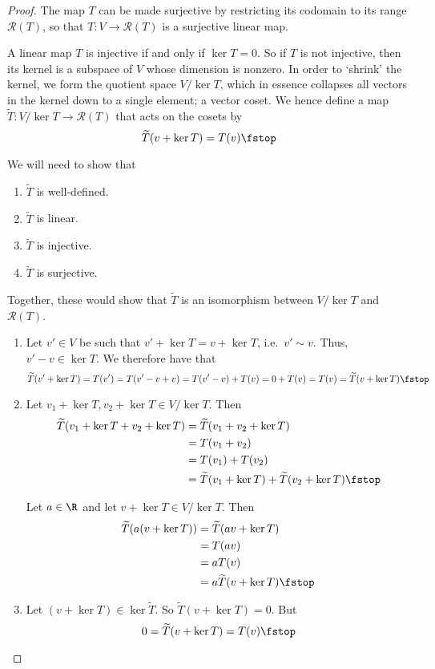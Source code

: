  \begin{proof}
   The map \( T \) can be made surjective by restricting its codomain to its range \( \mathcal{R}(T) \), so that \( T:V\to\mathcal{R}(T) \) is a surjective linear map.

   \vspace{3mm}

   A linear map \( T \) is injective if and only if \( \ker T=\qty{0} \). So if \( T \) is not injective, then its kernel is a subspace of \( V \) whose dimension is nonzero. In order to `shrink' the kernel, we form the quotient space \( V/\ker T \), which in essence collapses all vectors in the kernel down to a single element; a vector coset. We hence define a map \( \widetilde{T}:V/\ker T\to\mathcal{R}(T) \) that acts on the cosets by
   \[ \widetilde{T}(v+\ker T)=T(v)\fstop \]

   We will need to show that
   \begin{enumerate}[label=(\roman*)]
   \item \( \widetilde{T} \) is well-defined.
   \item \( \widetilde{T} \) is linear.
   \item \( \widetilde{T} \) is injective.
   \item \( \widetilde{T} \) is surjective.
   \end{enumerate}

   Together, these would show that \( \widetilde{T} \) is an isomorphism between \( V/\ker T \) and \( \mathcal{R}(T) \).
   \begin{enumerate}[label=(\roman*)]
   \item Let \( v'\in V \) be such that \( v'+\ker T=v+\ker T \), i.e.\ \( v'\sim v \). Thus, \( v'-v\in\ker T \). We therefore have that
     \[ \widetilde{T}(v'+\ker T)=T(v')=T(v'-v+v)=T(v'-v)+T(v)=0+T(v)=T(v)=\widetilde{T}(v+\ker T)\fstop \]
   \item Let \( v_1+\ker T, v_2+\ker T\in V/\ker T \). Then
     \begin{align*}
       \widetilde{T}(v_1+\ker T+v_2+\ker T)&= \widetilde{T}(v_1+v_2+\ker T)\\
       &= T(v_1+v_2)\\
       &= T(v_1)+T(v_2)\\
       &= \widetilde{T}(v_1+\ker T)+\widetilde{T}(v_2+\ker T)\fstop
     \end{align*}

     Let \( a\in\R \) and let \( v+\ker T\in V/\ker T \). Then
     \begin{align*}
       \widetilde{T}(a(v+\ker T))&= \widetilde{T}(av+\ker T)\\
       &= T(av)\\
       &= aT(v)\\
       &= a\widetilde{T}(v+\ker T)\fstop
     \end{align*}
   \item Let \( (v+\ker T)\in\ker\widetilde{T} \). So \( \widetilde{T}(v+\ker T)=0 \). But
     \[ 0=\widetilde{T}(v+\ker T)=T(v)\fstop \]


\end{enumerate}
\end{proof}
